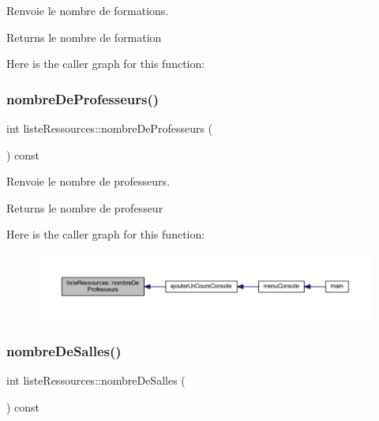 Renvoie le nombre de formations. 

\begin{DoxyReturn}{Returns}
le nombre de formation 
\end{DoxyReturn}
Here is the caller graph for this function\+:
\hypertarget{classliste_ressources_a9b496a36a9651347734d7895397dde00}{}\label{classliste_ressources_a9b496a36a9651347734d7895397dde00} 
\subsubsection{\texorpdfstring{nombre\+De\+Professeurs()}{nombreDeProfesseurs()}}
{\footnotesize\ttfamily int liste\+Ressources\+::nombre\+De\+Professeurs (\begin{DoxyParamCaption}{ }\end{DoxyParamCaption}) const}



Renvoie le nombre de professeurs. 

\begin{DoxyReturn}{Returns}
le nombre de professeur 
\end{DoxyReturn}
Here is the caller graph for this function\+:\nopagebreak
\begin{figure}[H]
\begin{center}
\leavevmode
\includegraphics[width=350pt]{classliste_ressources_a9b496a36a9651347734d7895397dde00_icgraph}
\end{center}
\end{figure}
\hypertarget{classliste_ressources_a1a7f82a289bda61cf08485e92dd32b2e}{}\label{classliste_ressources_a1a7f82a289bda61cf08485e92dd32b2e} 
\subsubsection{\texorpdfstring{nombre\+De\+Salles()}{nombreDeSalles()}}
{\footnotesize\ttfamily int liste\+Ressources\+::nombre\+De\+Salles (\begin{DoxyParamCaption}{ }\end{DoxyParamCaption}) const}



